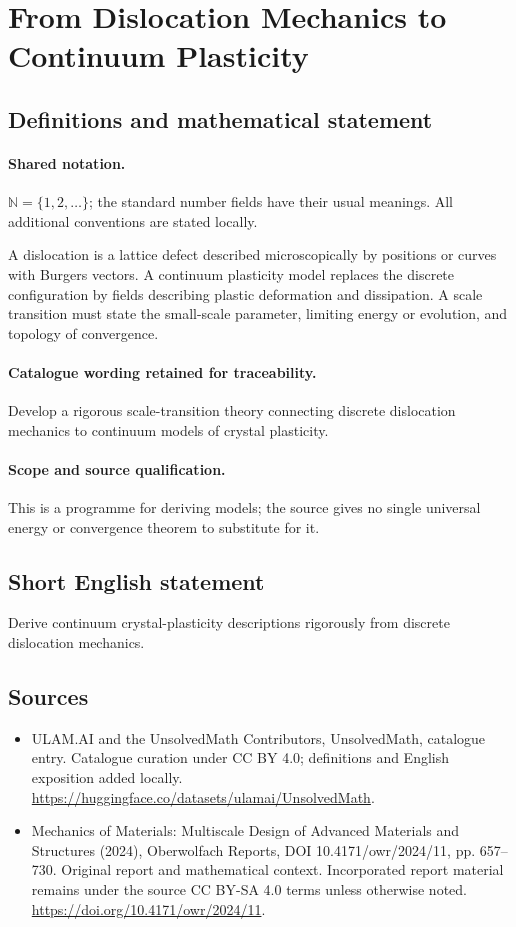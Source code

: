 \documentclass[11pt]{article}
\begin{document}
\section{From Dislocation Mechanics to Continuum Plasticity}\label{statement}

\subsection{Definitions and mathematical statement}

\paragraph{Shared notation.}$\mathbb N=\{1,2,\ldots\}$; the standard number fields have their usual meanings. All additional conventions are stated locally.


A dislocation is a lattice defect described microscopically by positions or curves with Burgers vectors. A continuum plasticity model replaces the discrete configuration by fields describing plastic deformation and dissipation. A scale transition must state the small-scale parameter, limiting energy or evolution, and topology of convergence.

\paragraph{Catalogue wording retained for traceability.}
Develop a rigorous scale-transition theory connecting discrete dislocation mechanics to continuum models of crystal plasticity.

\paragraph{Scope and source qualification.}This is a programme for deriving models; the source gives no single universal energy or convergence theorem to substitute for it.
\subsection{Short English statement}
Derive continuum crystal-plasticity descriptions rigorously from discrete dislocation mechanics.
\subsection{Sources}
\begin{itemize}
\item[\hypertarget{source:statement:1}{S1}] ULAM.AI and the UnsolvedMath Contributors, UnsolvedMath, catalogue entry. Catalogue curation under CC BY 4.0; definitions and English exposition added locally.
\url{https://huggingface.co/datasets/ulamai/UnsolvedMath}.
\item[\hypertarget{source:statement:2}{S2}] Mechanics of Materials: Multiscale Design of Advanced Materials and Structures (2024), Oberwolfach Reports, DOI 10.4171/owr/2024/11, pp. 657--730. Original report and mathematical context. Incorporated report material remains under the source CC BY-SA 4.0 terms unless otherwise noted.
\url{https://doi.org/10.4171/owr/2024/11}.
\end{itemize}
\label{end:statement}
\end{document}
